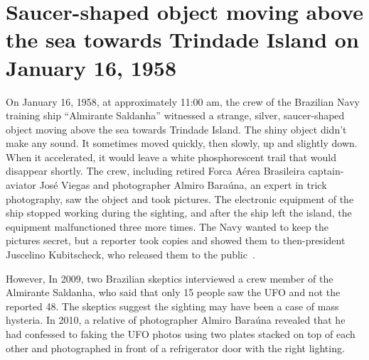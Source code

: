 \clearpage



\section{Saucer-shaped object moving above the sea towards Trindade Island on January 16, 1958}
\label{2023-UFO-part-History-photos-1958-tr}

On January 16, 1958, at approximately  11:00 am,  the crew of the Brazilian Navy training ship ``Almirante Saldanha'' witnessed a strange, silver,
saucer-shaped object moving above the sea towards Trindade Island.
The shiny object didn't make any sound. It sometimes moved quickly,
then slowly, up and slightly down.
When it accelerated, it would leave a white phosphorescent trail that would disappear shortly.
The crew, including retired Forca A\'erea Brasileira captain-aviator Jos\'e Viegas and photographer Almiro Bara\'una, an expert in trick photography,
saw the object and took pictures.
The electronic equipment of the ship stopped working during the sighting,
and after the ship left the island, the equipment malfunctioned three more times.
The Navy wanted to keep the pictures secret, but a reporter took copies and showed them to then-president Juscelino Kubitscheck,
who released them to the public~\cite{Trinitate1958Jan}.

However, In 2009, two Brazilian skeptics interviewed a crew member of the Almirante Saldanha,
who said that only 15 people saw the UFO and not the reported 48. The skeptics suggest the sighting may have been a case of mass hysteria.
In 2010, a relative of photographer Almiro Bara\'una revealed that he had confessed to faking the UFO photos using two plates stacked on
top of each other and photographed in front of a refrigerator door with the right lighting.

\newpage

